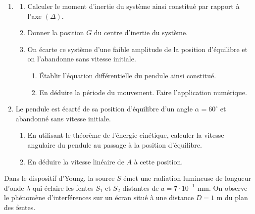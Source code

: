 \documentclass[11pt]{article}
\begin{document}
\begin{enumerate}
  \item \begin{enumerate}[label=\alph*.]
    \item Calculer le moment d'inertie du système ainsi constitué par rapport à l'axe $(\Delta)$.
    \item Donner la position $G$ du centre d'inertie du système.
    \item On écarte ce système d'une faible amplitude de la position d'équilibre et on l'abandonne sans vitesse initiale.
    \begin{enumerate}[label=c\textsubscript{\arabic*}.]
      \item Établir l'équation différentielle du pendule ainsi constitué.
      \item En déduire la période du mouvement. Faire l'application numérique.
    \end{enumerate}
  \end{enumerate}
  \item Le pendule est écarté de sa position d'équilibre d'un angle $\alpha = 60^\circ$ et abandonné sans vitesse initiale.
  \begin{enumerate}[label=\alph*.]
    \item En utilisant le théorème de l'énergie cinétique, calculer la vitesse angulaire du pendule au passage à la position d'équilibre.
    \item En déduire la vitesse linéaire de $A$ à cette position.
  \end{enumerate}
\end{enumerate}

Dans le dispositif d'Young, la source $S$ émet une radiation lumineuse de longueur d'onde $\lambda$ qui éclaire les fentes $S_1$ et $S_2$ distantes de $a = 7{\cdot}10^{-1}$ mm. On observe le phénomène d'interférences sur un écran situé à une distance $D = 1$ m du plan des fentes.
\end{document}
